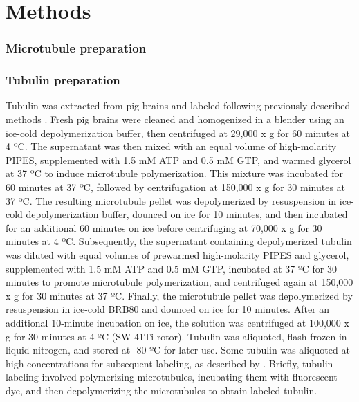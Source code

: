 \chapter{Methods}
\label{methods}

\subsection{Microtubule preparation}
\subsection{Tubulin preparation}
Tubulin was extracted from pig brains and labeled following previously described methods \parencite{CASTOLDI200383}. Fresh pig brains were cleaned and homogenized in a blender using an ice-cold depolymerization buffer, then centrifuged at 29,000 x g for 60 minutes at 4 ºC. The supernatant was then mixed with an equal volume of high-molarity PIPES, supplemented with 1.5 mM ATP and 0.5 mM GTP, and warmed glycerol at 37 ºC to induce microtubule polymerization. This mixture was incubated for 60 minutes at 37 ºC, followed by centrifugation at 150,000 x g for 30 minutes at 37 ºC. The resulting microtubule pellet was depolymerized by resuspension in ice-cold depolymerization buffer, dounced on ice for 10 minutes, and then incubated for an additional 60 minutes on ice before centrifuging at 70,000 x g for 30 minutes at 4 ºC. Subsequently, the supernatant containing depolymerized tubulin was diluted with equal volumes of prewarmed high-molarity PIPES and glycerol, supplemented with 1.5 mM ATP and 0.5 mM GTP, incubated at 37 ºC for 30 minutes to promote microtubule polymerization, and centrifuged again at 150,000 x g for 30 minutes at 37 ºC. Finally, the microtubule pellet was depolymerized by resuspension in ice-cold BRB80 and dounced on ice for 10 minutes. After an additional 10-minute incubation on ice, the solution was centrifuged at 100,000 x g for 30 minutes at 4 ºC (SW 41Ti rotor). Tubulin was aliquoted, flash-frozen in liquid nitrogen, and stored at -80 ºC for later use. Some tubulin was aliquoted at high concentrations for subsequent labeling, as described by \cite{HYMAN1991478}. Briefly, tubulin labeling involved polymerizing microtubules, incubating them with fluorescent dye, and then depolymerizing the microtubules to obtain labeled tubulin.

